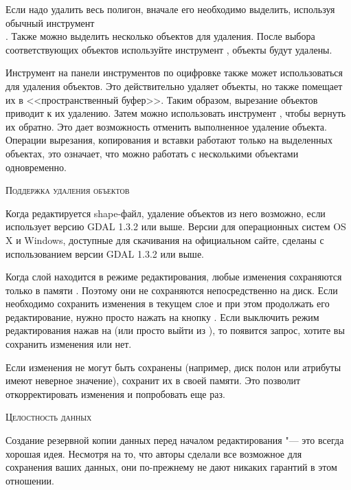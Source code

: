 
Если надо удалить весь полигон, вначале его необходимо выделить, используя
обычный инструмент \\
. Также можно
выделить несколько объектов для удаления. После выбора соответствующих
объектов используйте инструмент
, объекты будут удалены.

Инструмент  на панели
инструментов по оцифровке также может использоваться для удаления объектов.
Это действительно удаляет объекты, но также помещает их в <<пространственный
буфер>>. Таким образом, вырезание объектов приводит к их удалению. Затем можно
использовать инструмент ,
чтобы вернуть их обратно. Это дает возможность отменить выполненное удаление
объекта. Операции вырезания, копирования и вставки работают только на
выделенных объектах, это означает, что можно работать с несколькими объектами
одновременно.

\begin{Tip}\caption{\textsc{Поддержка удаления объектов}}
Когда редактируется shape-файл, удаление объектов из него возможно, если
\qg использует версию GDAL 1.3.2 или выше. Версии \qg для операционных
систем OS\,X и Windows, доступные для скачивания на официальном сайте,
сделаны с использованием версии GDAL 1.3.2 или выше.
\end{Tip}


Когда слой находится в режиме редактирования, любые изменения сохраняются
только в памяти \qg. Поэтому они не сохраняются непосредственно на диск.
Если необходимо сохранить изменения в текущем слое и при этом продолжать
его редактирование, нужно просто нажать на кнопку
. Если выключить режим
редактирования нажав на 
(или просто выйти из \qg), то появится запрос, хотите вы сохранить
изменения или нет.

Если изменения не могут быть сохранены (например, диск полон или атрибуты
имеют неверное значение), \qg сохранит их в своей памяти. Это позволит
откорректировать изменения и попробовать еще раз.

\begin{Tip}\caption{\textsc{Целостность данных}}
Создание резервной копии данных перед началом редактирования "--- это
всегда хорошая идея. Несмотря на то, что авторы \qg сделали все возможное
для сохранения ваших данных, они по-прежнему не дают никаких гарантий в
этом отношении.
\end{Tip}

